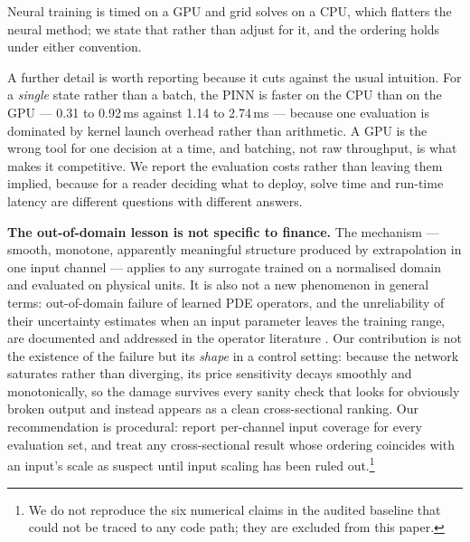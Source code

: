 \documentclass[conference]{IEEEtran}
\begin{document}
Neural training is timed on a GPU and grid solves on a CPU, which flatters the neural method; we
state that rather than adjust for it, and the ordering holds under either convention.

A further detail is worth reporting because it cuts against the usual intuition. For a
\emph{single} state rather than a batch, the PINN is faster on the CPU than on the GPU --- 0.31
to 0.92\,ms against 1.14 to 2.74\,ms --- because one evaluation is dominated by kernel launch
overhead rather than arithmetic. A GPU is the wrong tool for one decision at a time, and
batching, not raw throughput, is what makes it competitive. We report the evaluation costs
rather than leaving them implied, because for a reader deciding what to deploy, solve time and
run-time latency are different questions with different answers.

\textbf{The out-of-domain lesson is not specific to finance.} The mechanism --- smooth,
monotone, apparently meaningful structure produced by extrapolation in one input channel ---
applies to any surrogate trained on a normalised domain and evaluated on physical units. It is
also not a new phenomenon in general terms: out-of-domain failure of learned PDE operators, and
the unreliability of their uncertainty estimates when an input parameter leaves the training
range, are documented and addressed in the operator literature
\cite{chandra2024uncertainty}. Our contribution is not the existence of the failure but its
\emph{shape} in a control setting: because the network saturates rather than diverging, its price
sensitivity decays smoothly and monotonically, so the damage survives every sanity check that
looks for obviously broken output and instead appears as a clean cross-sectional ranking. Our
recommendation is procedural: report per-channel input coverage for every evaluation set, and
treat any cross-sectional result whose ordering coincides with an input's scale as suspect
until input scaling has been ruled out.\footnote{We do not reproduce the six numerical claims
in the audited baseline that could not be traced to any code path; they are excluded from
this paper.}
\end{document}
